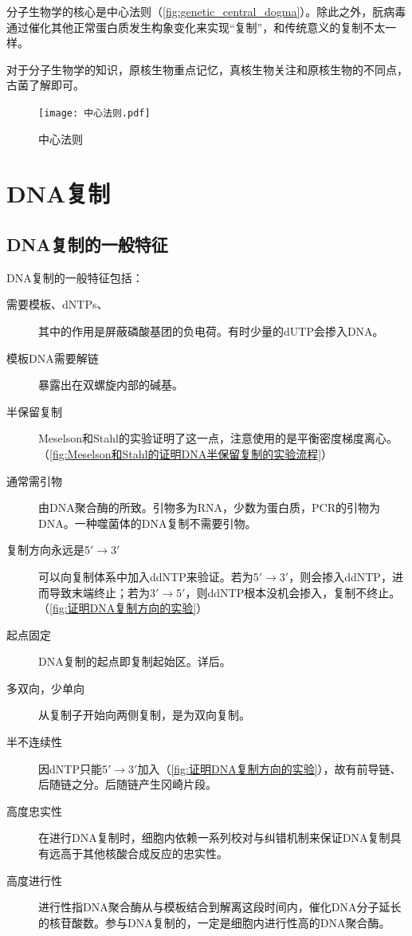 
分子生物学的核心是中心法则（\autoref{fig:genetic_central_dogma}）。除此之外，朊病毒通过催化其他正常蛋白质发生构象变化来实现“复制”，和传统意义的复制不太一样。

对于分子生物学的知识，原核生物重点记忆，真核生物关注和原核生物的不同点，古菌了解即可。

\begin{figure}[htbp]
	\centering
	\texttt{[image: 中心法则.pdf]}
	\caption{中心法则}
	\label{fig:genetic_central_dogma}
\end{figure}


\section{DNA复制}

\subsection{DNA复制的一般特征}

DNA复制的一般特征包括：

\begin{description}
	\item[需要模板、dNTPs、] 其中的作用是屏蔽磷酸基团的负电荷。有时少量的dUTP会掺入DNA。
	\item[模板DNA需要解链] 暴露出在双螺旋内部的碱基。
	\item[半保留复制] Meselson和Stahl的实验证明了这一点，注意使用的是平衡密度梯度离心。（\autoref{fig:Meselson和Stahl的证明DNA半保留复制的实验流程}）
	\item[通常需引物] 由DNA聚合酶的所致。引物多为RNA，少数为蛋白质，PCR的引物为DNA。一种噬菌体的DNA复制不需要引物。
	\item[复制方向永远是5$\prime$$\longrightarrow$3$\prime$] 可以向复制体系中加入ddNTP来验证。若为5$\prime$$\longrightarrow$3$\prime$，则会掺入ddNTP，进而导致末端终止；若为3$\prime$$\longrightarrow$5$\prime$，则ddNTP根本没机会掺入，复制不终止。（\autoref{fig:证明DNA复制方向的实验}）
	\item[起点固定] DNA复制的起点即复制起始区。详后。
	\item[多双向，少单向] 从复制子开始向两侧复制，是为双向复制。
	\item[半不连续性] 因dNTP只能5$\prime$$\longrightarrow$3$\prime$加入（\autoref{fig:证明DNA复制方向的实验}），故有前导链、后随链之分。后随链产生冈崎片段。
	\item[高度忠实性] 在进行DNA复制时，细胞内依赖一系列校对与纠错机制来保证DNA复制具有远高于其他核酸合成反应的忠实性。
	\item[高度进行性] 进行性指DNA聚合酶从与模板结合到解离这段时间内，催化DNA分子延长的核苷酸数。参与DNA复制的，一定是细胞内进行性高的DNA聚合酶。
\end{description}

